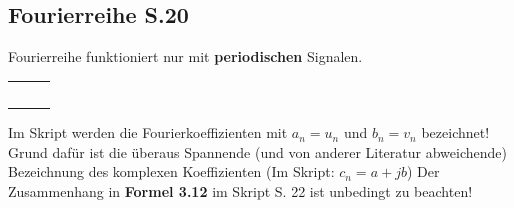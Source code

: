 \subsection{Fourierreihe S.20}

Fourierreihe funktioniert nur mit \textbf{periodischen} Signalen.

\begin{table}[H]
	\setcellgapes{6pt}
	\begin{tabularx}{\textwidth}{|Y|Y|Y|}
		\hline
		 &
		 &
		 \\
		\hline
		 &
		 &
		 \\
		\hline
		 &
		 &
		 \\
		\hline
		 &
		 &
		 \\
		\hline
		 &
		 &
		 \\
		\hline
		 &
		 &
		 \\
		\hline
	\end{tabularx}
\end{table}
Im Skript werden die Fourierkoeffizienten mit $a_n = u_n$ und $b_n = v_n$ bezeichnet! Grund dafür ist die überaus Spannende (und von anderer Literatur abweichende) Bezeichnung des komplexen Koeffizienten (Im Skript: $c_n = a + jb$) Der Zusammenhang in \textbf{Formel 3.12} im Skript S. 22 ist unbedingt zu beachten!

